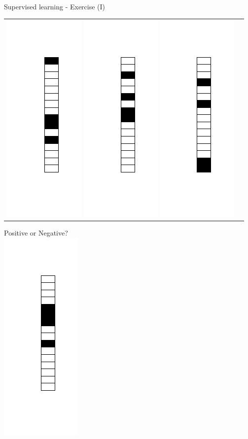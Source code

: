 \documentclass[color=usenames,dvipsnames]{beamer}
\begin{document}
\begin{frame}{Supervised learning - Exercise (I)}
\begin{table}[ht]
\begin{tabular}{c|c}
\includegraphics[width=0.1\linewidth]{../figures/1d_random_supervised_learning_2.png}
\includegraphics[width=0.1\linewidth]{../figures/1d_random_supervised_learning_3.png}
\includegraphics[width=0.1\linewidth]{../figures/1d_random_supervised_learning_4.png}
\\
\end{tabular}
\end{table}

\begin{center}
Positive or Negative?\\
\includegraphics[width=0.1\linewidth]{../figures/1d_pattern_supervised_learning_5.png}
\end{center}

\end{frame}
\end{document}
